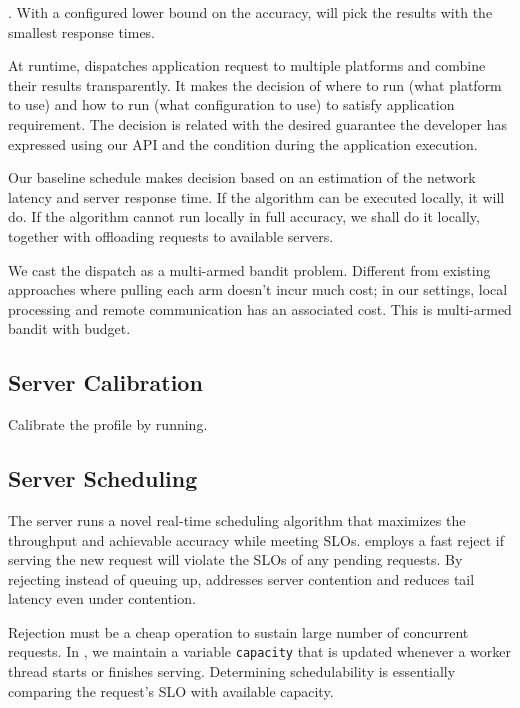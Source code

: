 . With a configured lower bound on the accuracy,
\sysname{} will pick the results with the smallest response times.

At runtime, \sysname{} dispatches application request to multiple platforms and
combine their results transparently. It makes the decision of where to run (what
platform to use) and how to run (what configuration to use) to satisfy
application requirement. The decision is related with the desired guarantee the
developer has expressed using our API and the condition during the application
execution.

 Our baseline schedule makes decision based on an
estimation of the network latency and server response time. If the algorithm can
be executed locally, it will do. If the algorithm cannot run locally in full
accuracy, we shall do it locally, together with offloading requests to available
servers.

 We cast the dispatch as a multi-armed bandit
problem. Different from existing approaches where pulling each arm doesn't incur
much cost; in our settings, local processing and remote communication has an
associated cost. This is multi-armed bandit with budget.

\subsection{Server Calibration}

Calibrate the profile by running.

\subsection{Server Scheduling}
\label{sec:server-scheduling}

The server runs a novel real-time scheduling algorithm that maximizes the
throughput and achievable accuracy while meeting SLOs. \sysname{} employs a fast
reject if serving the new request will violate the SLOs of any pending
requests. By rejecting instead of queuing up, \sysname{} addresses server
contention and reduces tail latency even under contention.

Rejection must be a cheap operation to sustain large number of concurrent
requests. In \sysname{}, we maintain a variable \texttt{capacity} that is
updated whenever a worker thread starts or finishes serving. Determining
schedulability is essentially comparing the request's SLO with available
capacity.

